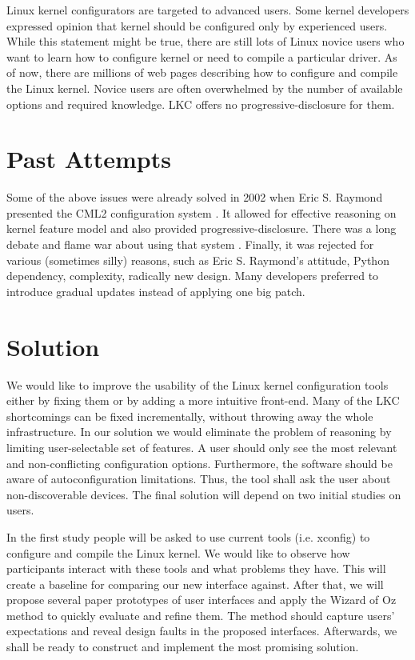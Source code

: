 \documentclass{chi2009}
\begin{document}
Linux kernel configurators are targeted to advanced users. Some kernel developers expressed opinion \cite{kernel:aunt:2002} that kernel should be configured only by experienced users. While this statement might be true, there are still lots of Linux novice users who want to learn how to configure kernel or need to compile a particular driver. As of now, there are millions of web pages describing how to configure and compile the Linux kernel. Novice users are often overwhelmed by the number of available options and required knowledge. LKC offers no progressive-disclosure for them.

\section{Past Attempts}
Some of the above issues were already solved in 2002 when Eric S. Raymond presented the CML2 configuration system \cite{raymond:cml2:2000}. It allowed for effective reasoning on kernel feature model and also provided progressive-disclosure. There was a long debate and flame war about using that system \cite{kerneltrap:linux:2002}. Finally, it was rejected for various (sometimes silly) reasons, such as Eric S. Raymond's attitude, Python dependency, complexity, radically new design. Many developers preferred to introduce gradual updates instead of applying one big patch.

\section{Solution}
We would like to improve the usability of the Linux kernel configuration tools either by fixing them or by adding a more intuitive front-end. Many of the LKC shortcomings can be fixed incrementally, without throwing away the whole infrastructure. In our solution we would eliminate the problem of reasoning by limiting user-selectable set of features. A user should only see the most relevant and non-conflicting configuration options. Furthermore, the software should be aware of autoconfiguration limitations. Thus, the tool shall ask the user about non-discoverable devices. The final solution will depend on two initial studies on users.

In the first study people will be asked to use current tools (i.e. \textsf{xconfig}) to configure and compile the Linux kernel. We would like to observe how participants interact with these tools and what problems they have. This will create a baseline for comparing our new interface against. After that, we will propose several paper prototypes of user interfaces and apply the Wizard of Oz method to quickly evaluate and refine them. The method should capture users' expectations and reveal design faults in the proposed interfaces. Afterwards, we shall be ready to construct and implement the most promising solution.
\end{document}
